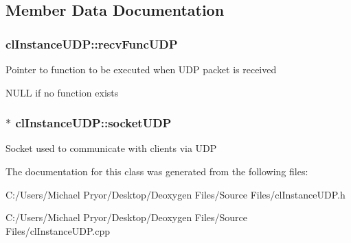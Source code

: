 \subsection{Member Data Documentation}
\hypertarget{classcl_instance_u_d_p_a71fd288aaec92fa83f45060bc15d1f1e}{
\subsubsection[{recvFuncUDP}]{ {\bf clInstanceUDP::recvFuncUDP}}}
\label{classcl_instance_u_d_p_a71fd288aaec92fa83f45060bc15d1f1e}
Pointer to function to be executed when UDP packet is received \par
 NULL if no function exists \hypertarget{classcl_instance_u_d_p_adabf31cb357eb5dada6ad5c8e57c611e}{
\subsubsection[{socketUDP}]{$\ast$ {\bf clInstanceUDP::socketUDP}}}
\label{classcl_instance_u_d_p_adabf31cb357eb5dada6ad5c8e57c611e}
Socket used to communicate with clients via UDP 

The documentation for this class was generated from the following files:\begin{DoxyCompactItemize}
\item 
C:/Users/Michael Pryor/Desktop/Deoxygen Files/Source Files/clInstanceUDP.h\item 
C:/Users/Michael Pryor/Desktop/Deoxygen Files/Source Files/clInstanceUDP.cpp\end{DoxyCompactItemize}
